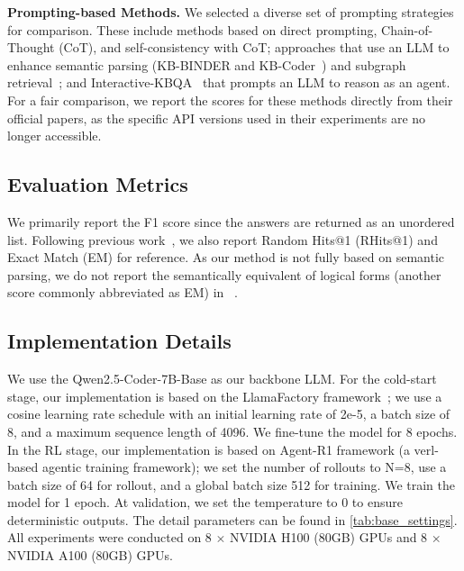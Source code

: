 \textbf{Prompting-based Methods.} We selected a diverse set of prompting strategies for comparison. These include methods based on direct prompting, Chain-of-Thought (CoT), and self-consistency with CoT; approaches that use an LLM to enhance semantic parsing (KB-BINDER\citep{li2023few} and KB-Coder~\citep{nie2024code}) and subgraph retrieval~\citep{tian2024augmenting}; and Interactive-KBQA~\citep{xiong2024interactive} that prompts an LLM to reason as an agent. For a fair comparison, we report the scores for these methods directly from their official papers, as the specific API versions used in their experiments are no longer accessible.

\subsection{Evaluation Metrics}
We primarily report the F1 score since the answers are returned as an unordered list. Following previous work~\citep{xiong2024interactive}, we also report Random Hits@1 (RHits@1) and Exact Match (EM) for reference. As our method is not fully based on semantic parsing, we do not report the semantically equivalent of logical forms (another score commonly abbreviated as EM) in ~\citet{gu2021beyond}.

\subsection{Implementation Details}
We use the Qwen2.5-Coder-7B-Base as our backbone LLM. For the cold-start stage, our implementation is based on the LlamaFactory framework~\citep{zheng2024llamafactory}; we use a cosine learning rate schedule with an initial learning rate of 2e-5, a batch size of 8, and a maximum sequence length of 4096. We fine-tune the model for 8 epochs. In the RL stage, our implementation is based on Agent-R1 framework \citep{Agent-R1} (a verl-based \citep{sheng2024hybridflow} agentic training framework); we set the number of rollouts to N=8, use a batch size of 64 for rollout, and a global batch size 512 for training. We train the model for 1 epoch. At validation, we set the temperature to 0 to ensure deterministic outputs. The detail parameters can be found in \ref{tab:base_settings}. All experiments were conducted on 8 $\times$ NVIDIA H100 (80GB) GPUs and 8 $\times$ NVIDIA A100 (80GB) GPUs.

